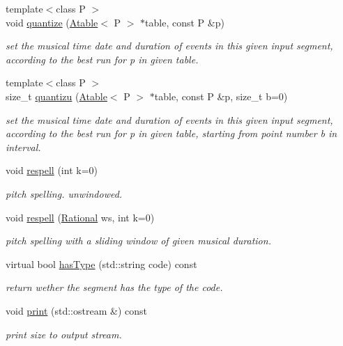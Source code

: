 \begin{DoxyCompactItemize}
{\footnotesize template$<$class P $>$ }\\void \mbox{\hyperlink{group__segment_ga42c65e4989c84fbce42115d8e7813f8e}{quantize}} (\mbox{\hyperlink{classAtable}{Atable}}$<$ P $>$ $\ast$table, const P \&p)
\begin{DoxyCompactList}\small\item\em set the musical time date and duration of events in this given input segment, according to the best run for p in given table. \end{DoxyCompactList}\item 
{\footnotesize template$<$class P $>$ }\\size\+\_\+t \mbox{\hyperlink{group__segment_gab4c42d088ce3d170b7899712789ab464}{quantizu}} (\mbox{\hyperlink{classAtable}{Atable}}$<$ P $>$ $\ast$table, const P \&p, size\+\_\+t b=0)
\begin{DoxyCompactList}\small\item\em set the musical time date and duration of events in this given input segment, according to the best run for p in given table, starting from point number b in interval. \end{DoxyCompactList}\item 
void \mbox{\hyperlink{group__segment_ga2d78677ab3ea44ae91034c4e312e778c}{respell}} (int k=0)
\begin{DoxyCompactList}\small\item\em pitch spelling. unwindowed. \end{DoxyCompactList}\item 
void \mbox{\hyperlink{group__segment_gac79787254008e05d9f54226d93dcb0cb}{respell}} (\mbox{\hyperlink{classRational}{Rational}} ws, int k=0)
\begin{DoxyCompactList}\small\item\em pitch spelling with a sliding window of given musical duration. \end{DoxyCompactList}\item 
virtual bool \mbox{\hyperlink{classInputSegment_a3989ef5c44913cb1896920916cdcfcf8}{has\+Type}} (std\+::string code) const
\begin{DoxyCompactList}\small\item\em return wether the segment has the type of the code. \end{DoxyCompactList}\item 
void \mbox{\hyperlink{group__segment_ga623c2367191018ecac046e7e11f14976}{print}} (std\+::ostream \&) const
\begin{DoxyCompactList}\small\item\em print size to output stream. \end{DoxyCompactList}\end{DoxyCompactItemize}
